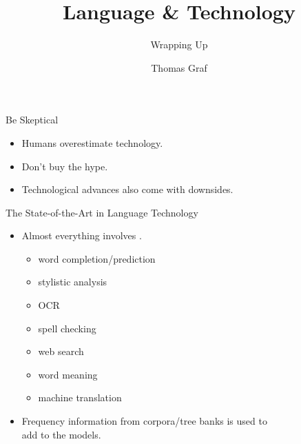 \documentclass[xcolor={usenames,svgnames,x11names,dvipsnames,table}]{beamer}
\title{\texorpdfstring{Language \& Technology}{Language and Technology}}
\subtitle{Wrapping Up}
\author{Thomas Graf}
\institute{Stony Brook University\\\texttt{lin120@thomasgraf.net}}
\date{}
\begin{document}
\unnumbered{
\begin{frame}
	\titlepage
\end{frame}
}

\begin{frame}{Be Skeptical}
    \begin{itemize}
        \item Humans overestimate technology.\\
        \item Don't buy the hype.\\
        \item Technological advances also come with downsides.\\
    \end{itemize}
\end{frame}

\begin{frame}{The State-of-the-Art in Language Technology} 
    \begin{itemize}
        \item Almost everything involves .
            \begin{itemize}
                \item word completion\slash prediction
                \item stylistic analysis
                \item OCR
                \item spell checking
                \item web search
                \item word meaning
                \item machine translation
            \end{itemize}
        \item Frequency information from corpora\slash tree banks is used to\\
            add  to the models.
    \end{itemize}
\end{frame}
\end{document}
